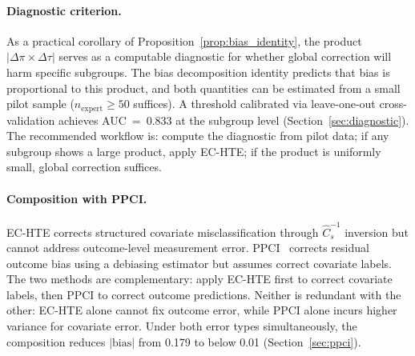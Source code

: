 \paragraph{Diagnostic criterion.}
As a practical corollary of Proposition~\ref{prop:bias_identity}, the product $|\Delta\pi \times \Delta\tau|$ serves as a computable diagnostic for whether global correction will harm specific subgroups.
The bias decomposition identity predicts that bias is proportional to this product, and both quantities can be estimated from a small pilot sample ($n_{\text{expert}} \geq 50$ suffices).
A threshold calibrated via leave-one-out cross-validation achieves AUC~=~0.833 at the subgroup level (Section~\ref{sec:diagnostic}).
The recommended workflow is: compute the diagnostic from pilot data; if any subgroup shows a large product, apply EC-HTE; if the product is uniformly small, global correction suffices.

\paragraph{Composition with PPCI.}
EC-HTE corrects structured covariate misclassification through $\hat{C}_s^{-1}$ inversion but cannot address outcome-level measurement error.
PPCI~\cite{sui2026ppci} corrects residual outcome bias using a debiasing estimator but assumes correct covariate labels.
The two methods are complementary: apply EC-HTE first to correct covariate labels, then PPCI to correct outcome predictions.
Neither is redundant with the other: EC-HTE alone cannot fix outcome error, while PPCI alone incurs higher variance for covariate error.
Under both error types simultaneously, the composition reduces $|\text{bias}|$ from 0.179 to below 0.01 (Section~\ref{sec:ppci}).
